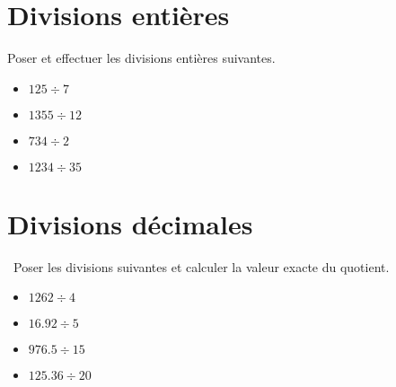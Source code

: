 
\section{Divisions entières}


\begin{questions}
	
	\question[8] Poser et effectuer les divisions entières suivantes.
	\begin{multicols}{2}
		\begin{itemize}
			\item $125 \div 7$ 
			\item $1355 \div 12$ 
			\item $734 \div 2$
			\item $1234 \div 35$
		\end{itemize}
	\end{multicols}
	\fillwithdottedlines{15cm}	
	
	
	
\end{questions}	

\section{Divisions décimales}


\begin{questions}
	
	\question[12]  Poser les divisions suivantes et calculer la valeur exacte du quotient.
	\begin{multicols}{2}
		\begin{itemize}
			\item $\num{1262} \div 4$ 
			\item $\num{16.92} \div 5$ 
			\item $\num{976.5} \div 15$
			\item $\num{125.36} \div 20$
		\end{itemize}
	\end{multicols}
	\fillwithdottedlines{18cm}
	
\end{questions}